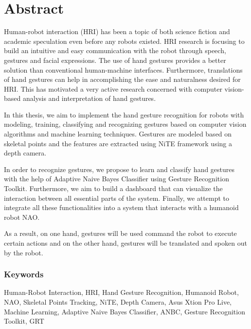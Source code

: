 \chapter*{Abstract} Human-robot interaction (HRI) has been a topic of both science fiction and academic speculation even before any robots existed. HRI research is focusing to build an intuitive and easy communication with the robot through speech, gestures and facial expressions. The use of hand gestures provides a better solution than conventional human-machine interfaces. Furthermore, translations of hand gestures can help in accomplishing the ease and naturalness desired for HRI. This has motivated a very active research concerned with computer vision-based analysis and interpretation of hand gestures.

In this thesis, we aim to implement the hand gesture recognition for robots with modeling, training, classifying and recognizing gestures based on computer vision algorithms and machine learning techniques. Gestures are modeled based on skeletal points and the features are extracted using NiTE framework using a depth camera. 

In order to recognize gestures, we propose to learn and classify hand gestures with the help of Adaptive Naive Bayes Classifier using Gesture Recognition Toolkit. Furthermore, we aim to build a dashboard that can visualize the interaction between all essential parts of the system. Finally, we attempt to integrate all these functionalities into a system that interacts with a humanoid robot NAO.

As a result, on one hand, gestures will be used command the robot to execute certain actions and on the other hand, gestures will be translated and spoken out by the robot. 

\subsection*{Keywords} Human-Robot Interaction, HRI, Hand Gesture Recognition, Humanoid Robot, NAO, Skeletal Points Tracking, NiTE, Depth Camera, Asus Xtion Pro Live, Machine Learning, Adaptive Naive Bayes Classifier, ANBC, Gesture Recognition Toolkit, GRT
